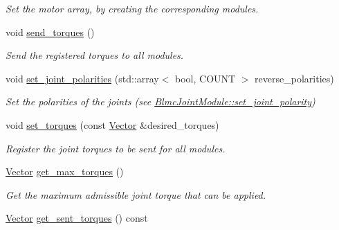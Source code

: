 \begin{DoxyCompactItemize}
\begin{DoxyCompactList}\small\item\em Set the motor array, by creating the corresponding modules. \end{DoxyCompactList}\item 
\mbox{\label{classblmc__robots_1_1BlmcJointModules_a26d4d675142bc783c1f983d135a41a09}} 
void \hyperlink{classblmc__robots_1_1BlmcJointModules_a26d4d675142bc783c1f983d135a41a09}{send\+\_\+torques} ()
\begin{DoxyCompactList}\small\item\em Send the registered torques to all modules. \end{DoxyCompactList}\item 
void \hyperlink{classblmc__robots_1_1BlmcJointModules_a97f538c52a1c00846497417333f93230}{set\+\_\+joint\+\_\+polarities} (std\+::array$<$ bool, C\+O\+U\+NT $>$ reverse\+\_\+polarities)
\begin{DoxyCompactList}\small\item\em Set the polarities of the joints (see \hyperlink{classblmc__robots_1_1BlmcJointModule_a137da65771a8628db4692e3bfc924f07}{Blmc\+Joint\+Module\+::set\+\_\+joint\+\_\+polarity}) \end{DoxyCompactList}\item 
void \hyperlink{classblmc__robots_1_1BlmcJointModules_ac7dba81727847238fc4c42b7dca6a0ea}{set\+\_\+torques} (const \hyperlink{classblmc__robots_1_1BlmcJointModules_abaff382c6fd4b494ec0c17498d94919e}{Vector} \&desired\+\_\+torques)
\begin{DoxyCompactList}\small\item\em Register the joint torques to be sent for all modules. \end{DoxyCompactList}\item 
\hyperlink{classblmc__robots_1_1BlmcJointModules_abaff382c6fd4b494ec0c17498d94919e}{Vector} \hyperlink{classblmc__robots_1_1BlmcJointModules_a6cc2989e6132988557ebe03e69658f50}{get\+\_\+max\+\_\+torques} ()
\begin{DoxyCompactList}\small\item\em Get the maximum admissible joint torque that can be applied. \end{DoxyCompactList}\item 
\hyperlink{classblmc__robots_1_1BlmcJointModules_abaff382c6fd4b494ec0c17498d94919e}{Vector} \hyperlink{classblmc__robots_1_1BlmcJointModules_a92f207c6fe5f8fd341b31ef15669fb83}{get\+\_\+sent\+\_\+torques} () const

\end{DoxyCompactItemize}
